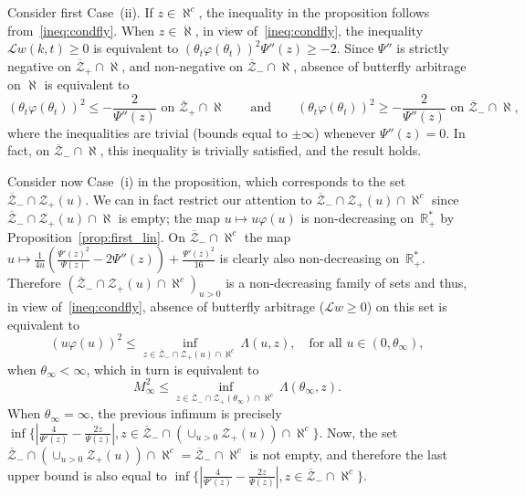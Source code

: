 \documentclass{amsart}[11pt]
\numberwithin{equation}{section}
\theoremstyle{definition}
\newcommand{\RR}{\mathbb{R}}
\newcommand{\Ll}{\mathcal{L}}
\newcommand{\Zz}{\mathcal{Z}}
\begin{document}
Consider first Case~(ii).
If $z \in \aleph^c$, the inequality in the proposition follows from~\eqref{ineq:condfly}.
When $z\in\aleph$, in view of~\eqref{ineq:condfly}, the inequality $\Ll w(k,t)\geq 0$ is equivalent to
$(\theta_t \varphi(\theta_t))^2 \Psi''(z) \geq -2$.
Since $\Psi''$ is strictly negative on $\overline{\Zz}_+\cap\aleph$, and non-negative on $\overline{\Zz}_-\cap\aleph$, absence of butterfly arbitrage on $\aleph$ is equivalent to
\begin{equation*}
\displaystyle (\theta_t \varphi(\theta_t))^2 \leq -\frac{2}{\Psi''(z)}
\text{ on }\overline{\Zz}_+\cap\aleph
\qquad\text{and}\qquad
\displaystyle (\theta_t \varphi(\theta_t))^2 \geq -\frac{2}{\Psi''(z)}
\text{ on }\overline{\Zz}_-\cap\aleph,
\end{equation*}
where the inequalities are trivial (bounds equal to $\pm\infty$) 
whenever $\Psi''(z)=0$.
In fact, on $\overline{\Zz}_-\cap\aleph$, this inequality is trivially satisfied, and the result holds.

Consider now Case~(i) in the proposition, which corresponds to the set $\overline{\Zz}_-\cap \Zz_+(u)$.
We can in fact restrict our attention to $\overline{\Zz}_-\cap \Zz_+(u)\cap\aleph^c$ since $\overline{\Zz}_-\cap \Zz_+(u)\cap\aleph$ is empty;
the map $u \mapsto u \varphi(u)$ is non-decreasing on~$\RR_+^*$ by Proposition~\ref{prop:first_lin}.
On $\overline{\Zz}_-\cap\aleph^c$ 
the map $u \mapsto \frac{1}{4 u} (\frac{\Psi'(z)^{2}}{\Psi(z)}-2\Psi''(z))+\frac{\Psi'(z)^{2}}{16}$
is clearly also non-decreasing on~$\RR_+^*$.
Therefore $(\overline{\Zz}_{-} \cap \Zz_+(u)\cap\aleph^c)_{u>0}$ is a non-decreasing family of sets 
and thus, in view of~\eqref{ineq:condfly}, 
absence of butterfly arbitrage ($\mathcal{L}w\geq 0$) on this set is equivalent to 
$$
(u \varphi(u))^2 \leq \inf_{z \in \overline{\Zz}_- \cap \Zz_+(u)\cap\aleph^c} 
\Lambda(u,z),
\quad\text{for all }u \in (0, \theta_\infty),$$
when $\theta_\infty<\infty$, which in turn is equivalent to
$$ 
M_\infty^2 \leq \inf_{z \in \overline{\Zz}_{-} \cap \Zz_+(\theta_\infty)\cap\aleph^c}
 \Lambda(\theta_\infty,z).
$$
When $\theta_\infty=\infty$, the previous infimum is precisely 
$\inf\{|\frac{4}{\Psi'(z)}-\frac{2z}{\Psi(z)}|, 
z\in \overline{\Zz}_- \cap \left(\cup_{u>0} \Zz_+(u)\right)\cap\aleph^c \} $. 
Now, the set 
$\overline{\Zz}_- \cap \left(\cup_{u>0} \Zz_+(u)\right)\cap\aleph^c = \overline{\Zz}_{-}\cap\aleph^c$
is not empty, and therefore the last upper bound is also equal to 
$\inf\{|\frac{4}{\Psi'(z)}-\frac{2z}{\Psi(z)}|, z\in \overline{\Zz}_- \cap\aleph^c\} $.
\end{document}
